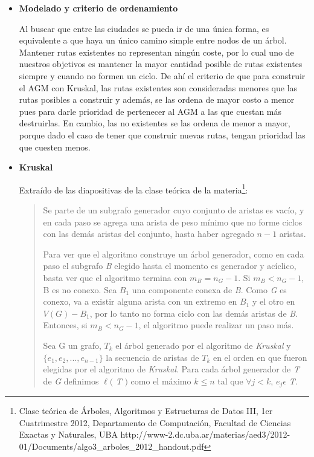 \begin{itemize}


\item \textbf{Modelado y criterio de ordenamiento}

\quad Al buscar que entre las ciudades se pueda ir de una \'unica forma, es equivalente a que haya un \'unico camino simple entre nodos de un \'arbol.  Mantener rutas existentes no representan ningún coste, por lo cual uno de nuestros objetivos es mantener la mayor cantidad posible de rutas existentes siempre y cuando no formen un ciclo. De ahí el criterio de que para construir el AGM con Kruskal, las rutas existentes son consideradas menores que las rutas posibles a construir y además, se las ordena de mayor costo a menor pues para darle prioridad de pertenecer al AGM a las que cuestan más destruirlas. En cambio, las no existentes se las ordena de menor a mayor, porque dado el caso de tener que construir nuevas rutas, tengan prioridad las que cuesten menos.

\item \textbf{Kruskal}

\quad Extra\'ido de las diapositivas de la clase te\'orica de la materia\footnote{Clase teórica de Árboles, Algoritmos y Estructuras de Datos III, 1er Cuatrimestre 2012, Departamento de Computación, Facultad de Ciencias Exactas y Naturales, UBA http://www-2.dc.uba.ar/materias/aed3/2012-01/Documents/algo3\_arboles\_2012\_handout.pdf}:

\begin{quotation}
 

\quad Se parte de un subgrafo generador cuyo conjunto de aristas es vac\'io, y en cada paso se agrega una arista de peso m\'inimo que no forme ciclos con 
las dem\'as aristas del conjunto, hasta haber agregado $n - 1$ aristas.

\quad Para ver que el algoritmo construye un \'arbol generador, como en cada paso el subgrafo \textit{B} elegido hasta el momento es generador y ac\'iclico,
basta ver que el algoritmo termina con $ m_B  =  n_G - 1$. Si $ m_B < n_G - 1$, B es no conexo. Sea $ B_1 $ una componente conexa de \textit{B}. Como \textit{G} es conexo, va a existir alguna arista con un extremo en $ B_1 $ y el otro en $ V(G) - B_1 $, por lo tanto no forma ciclo con las dem\'as aristas de \textit{B}. Entonces, si $ m_B < n_G - 1$, el algoritmo puede realizar un paso m\'as.

\quad Sea G un grafo, $ T_k $ el \'arbol generado por el algoritmo de \textit{Kruskal} y $ \lbrace e_1, e_2, ..., e_{n-1} \rbrace $ la secuencia de aristas de $ T_k $ en el orden en que fueron elegidas por el algoritmo de \textit{Kruskal}. Para cada \'arbol generador de \textit{T} de \textit{G} definimos $\ell($ \textit{T} $)$ como el m\'aximo $ k \leq n $ tal que $ \forall j < k $, $ e_j \epsilon $ \textit{T}.


\end{quotation}
\end{itemize}
